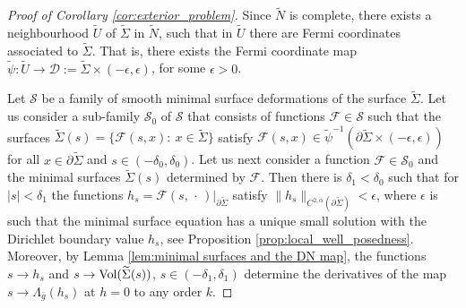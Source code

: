 \documentclass[12pt]{amsart}
\def\p{\partial}
\def\R{\mathbb R}
\DeclarePairedDelimiter\norm{\lVert}{\rVert}
\theoremstyle{definition}
\theoremstyle{remark}
\newcommand{\eps}{\epsilon}
\newcommand{\ccdot}{\,\cdot\,}
\begin{document}
\begin{proof}[Proof of Corollary \ref{cor:exterior_problem}]
Since $\widetilde N$ is complete, there exists a neighbourhood $\widetilde U$ of $\widetilde\Sigma$ in $\widetilde N$,
such that in  $\widetilde U$ there are  Fermi coordinates associated to $\widetilde\Sigma$. That is, there exists the Fermi coordinate map $\tilde \psi:\widetilde U\to \mathcal{D}:=\widetilde\Sigma \times (-\eps,\eps)$, for some $\eps>0$. 


 
 
 Let $\mathcal S$ be   a family of smooth  minimal surface  deformations of the surface $\widetilde \Sigma$.
Let us consider a sub-family $\mathcal S_0$ of $\mathcal S$ that consists of functions 
$\mathcal F \in \mathcal S$ such that the surfaces  $\widetilde \Sigma(s)=\{\mathcal F(s,x):\ x\in \widetilde \Sigma\}$ satisfy $\mathcal F(s,x) \in \tilde \psi^{-1}(\p \widetilde \Sigma \times (-\eps,\eps))$ for 
all $x\in \p \widetilde \Sigma$  and $s\in (-\delta_0,\delta_0)$.
Let us next consider a function $\mathcal F \in \mathcal S_0$ and the minimal 
surfaces $\widetilde \Sigma(s)$  determined by $\mathcal F$. Then there is $\delta_1<\delta_0$  such that 
for $|s|<\delta_1$  the functions
$h_s=\mathcal F(s,\ccdot)|_{\p  \widetilde \Sigma}$  satisfy 
$\|h_s\|_{C^{2,\alpha}(\p \widetilde  \Sigma)}<\eps$, where $\eps$  is such that the minimal surface equation has
 a unique small solution with the Dirichlet boundary value $h_s$, see Proposition \ref{prop:local_well_posedness}. Moreover, by  Lemma \ref{lem:minimal surfaces and the DN map},
the functions  $s\to h_s$  and $s\to 
\hbox{Vol}(\widetilde \Sigma(s))$, $s\in (-\delta_1,\delta_1)$ determine the
 derivatives of the map $s\to \Lambda_{\overline g}(h_s)$ 
at $h=0$ to any order $k$.
% 
%
%
%
%
%
%
%
% 

\end{proof}
\end{document}
